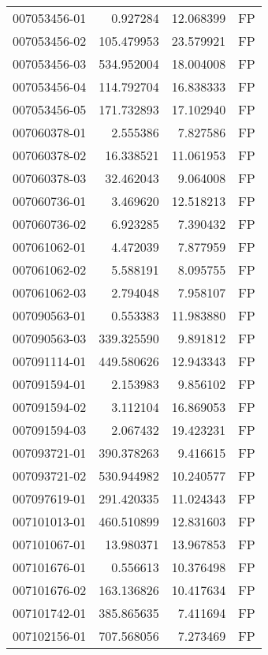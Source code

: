 \begin{tabular}{lrrl}
007053456-01 &    0.927284 &      12.068399 &   FP \\
007053456-02 &  105.479953 &      23.579921 &   FP \\
007053456-03 &  534.952004 &      18.004008 &   FP \\
007053456-04 &  114.792704 &      16.838333 &   FP \\
007053456-05 &  171.732893 &      17.102940 &   FP \\
007060378-01 &    2.555386 &       7.827586 &   FP \\
007060378-02 &   16.338521 &      11.061953 &   FP \\
007060378-03 &   32.462043 &       9.064008 &   FP \\
007060736-01 &    3.469620 &      12.518213 &   FP \\
007060736-02 &    6.923285 &       7.390432 &   FP \\
007061062-01 &    4.472039 &       7.877959 &   FP \\
007061062-02 &    5.588191 &       8.095755 &   FP \\
007061062-03 &    2.794048 &       7.958107 &   FP \\
007090563-01 &    0.553383 &      11.983880 &   FP \\
007090563-03 &  339.325590 &       9.891812 &   FP \\
007091114-01 &  449.580626 &      12.943343 &   FP \\
007091594-01 &    2.153983 &       9.856102 &   FP \\
007091594-02 &    3.112104 &      16.869053 &   FP \\
007091594-03 &    2.067432 &      19.423231 &   FP \\
007093721-01 &  390.378263 &       9.416615 &   FP \\
007093721-02 &  530.944982 &      10.240577 &   FP \\
007097619-01 &  291.420335 &      11.024343 &   FP \\
007101013-01 &  460.510899 &      12.831603 &   FP \\
007101067-01 &   13.980371 &      13.967853 &   FP \\
007101676-01 &    0.556613 &      10.376498 &   FP \\
007101676-02 &  163.136826 &      10.417634 &   FP \\
007101742-01 &  385.865635 &       7.411694 &   FP \\
007102156-01 &  707.568056 &       7.273469 &   FP \\

\end{tabular}

